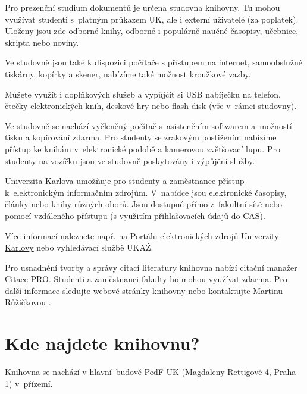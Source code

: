 Pro prezenční studium dokumentů je určena studovna knihovny. Tu mohou
využívat studenti s~platným průkazem UK, ale i externí uživatelé (za
poplatek). Uloženy jsou zde odborné knihy, odborné i populárně naučné
časopisy, učebnice, skripta nebo noviny.

Ve studovně jsou také k dispozici počítače s přístupem na internet,
samoobslužné tiskárny, kopírky a skener, nabízíme také možnost kroužkové
vazby.

Můžete využít i doplňkových služeb a vypůjčit si USB nabíječku na
telefon, čtečky elektronických knih, deskové hry nebo flash disk (vše
v~rámci studovny).



Ve studovně se nachází vyčleněný počítač s~asistenčním softwarem
a~možností tisku a kopírování zdarma. Pro studenty se zrakovým
postižením nabízíme přístup ke knihám v~elektronické podobě a kamerovou
zvětšovací lupu. Pro studenty na vozíčku jsou ve studovně poskytovány i
výpůjční služby.


Univerzita Karlova umožňuje pro studenty a zaměstnance přístup
k~elektronickým informačním zdrojům. V~nabídce jsou elektronické
časopisy, články nebo knihy různých oborů. Jsou dostupné přímo
z~fakultní sítě nebo pomocí vzdáleného přístupu (s využitím
přihlašovacích údajů do CAS).

Více informací naleznete např. na Portálu elektronických zdrojů
{\href{http://pez.cuni.cz}{Univerzity Karlovy}} nebo vyhledávací
službě UKAŽ.


Pro usnadnění tvorby a správy citací literatury knihovna nabízí citační
manažer Citace PRO. Studenti a zaměstnanci fakulty ho mohou využívat
zdarma. Pro další informace sledujte webové stránky knihovny nebo
kontaktujte Martinu Růžičkovou
.

\section{Kde najdete knihovnu?}

Knihovna se nachází v hlavní~budově PedF UK (Magdaleny Rettigové 4,
Praha 1) v~přízemí.

